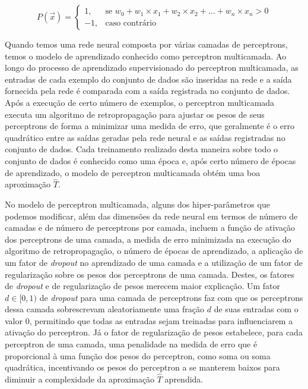 \begin{equation} \label{eq:perceptron}
  P(\vec{x}) =
  \begin{cases}
    1, & \text{se } w_{0} + w_{1} \times x_{1} + w_{2} \times x_{2} + ... + w_{n} \times x_{n} > 0\\
    -1, & \text{caso contrário}
  \end{cases}
\end{equation}

Quando temos uma rede neural composta por várias camadas de perceptrons, temos o modelo de aprendizado conhecido como perceptron multicamada. Ao longo do processo de aprendizado supervisionado do perceptron multicamada, as entradas de cada exemplo do conjunto de dados são inseridas na rede e a saída fornecida pela rede é comparada com a saída registrada no conjunto de dados. Após a execução de certo número de exemplos, o perceptron multicamada executa um algoritmo de retropropagação para ajustar os pesos de seus perceptrons de forma a minimizar uma medida de erro, que geralmente é o erro quadrático entre as saídas geradas pela rede neural e as saídas registradas no conjunto de dados.\cite[p.97]{machine_learning} Cada treinamento realizado desta maneira sobre todo o conjunto de dados é conhecido como uma época e, após certo número de épocas de aprendizado, o modelo de perceptron multicamada obtém uma boa aproximação $\hat{T}$.

No modelo de perceptron multicamada, alguns dos hiper-parâmetros que podemos modificar, além das dimensões da rede neural em termos de número de camadas e de número de perceptrons por camada, incluem a função de ativação dos perceptrons de uma camada, a medida de erro minimizada na execução do algoritmo de retropropagação, o número de épocas de aprendizado, a aplicação de um fator de \textit{dropout} no aprendizado de uma camada e a utilização de um fator de regularização sobre os pesos dos perceptrons de uma camada. Destes, os fatores de \textit{dropout} e de regularização de pesos merecem maior explicação. Um fator $d \in [0, 1)$ de \textit{dropout} para uma camada de perceptrons faz com que os perceptrons dessa camada sobrescrevam aleatoriamente uma fração $d$ de suas entradas com o valor 0, permitindo que todas as entradas sejam treinadas para influenciarem a ativação do perceptron. Já o fator de regularização de pesos estabelece, para cada perceptron de uma camada, uma penalidade na medida de erro que é proporcional à uma função dos pesos do perceptron, como soma ou soma quadrática, incentivando os pesos do perceptron a se manterem baixos para diminuir a complexidade da aproximação $\hat{T}$ aprendida.\cite[p.111]{machine_learning}

